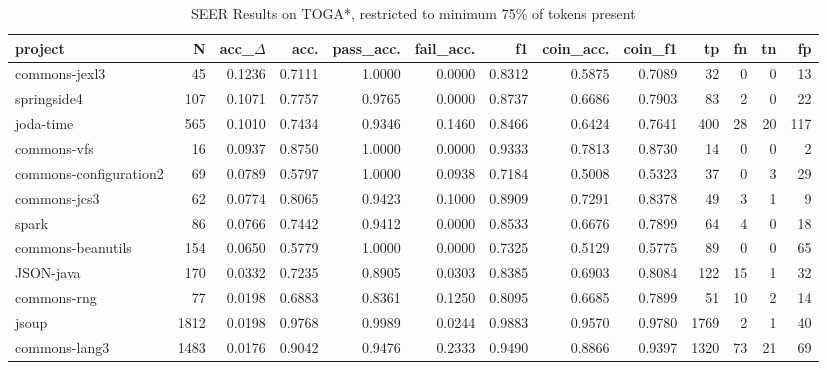 \begin{table*}
\centering
\caption{SEER Results on TOGA*, restricted to minimum 75\% of tokens present}
\label{tab:toga_results_25}
\begin{tabular}{lrrrrrrrrrrrr}
\toprule
                project &     N &  acc\_$\Delta$ &    acc. &  pass\_acc. &  fail\_acc. &      f1 &  coin\_acc. &  coin\_f1 &    tp &   fn &  tn &   fp \\
\midrule
          commons-jexl3 &    45 &      0.1236 &  0.7111 &     1.0000 &     0.0000 &  0.8312 &     0.5875 &   0.7089 &    32 &    0 &   0 &   13 \\
            springside4 &   107 &      0.1071 &  0.7757 &     0.9765 &     0.0000 &  0.8737 &     0.6686 &   0.7903 &    83 &    2 &   0 &   22 \\
              joda-time &   565 &      0.1010 &  0.7434 &     0.9346 &     0.1460 &  0.8466 &     0.6424 &   0.7641 &   400 &   28 &  20 &  117 \\
            commons-vfs &    16 &      0.0937 &  0.8750 &     1.0000 &     0.0000 &  0.9333 &     0.7813 &   0.8730 &    14 &    0 &   0 &    2 \\
 commons-configuration2 &    69 &      0.0789 &  0.5797 &     1.0000 &     0.0938 &  0.7184 &     0.5008 &   0.5323 &    37 &    0 &   3 &   29 \\
           commons-jcs3 &    62 &      0.0774 &  0.8065 &     0.9423 &     0.1000 &  0.8909 &     0.7291 &   0.8378 &    49 &    3 &   1 &    9 \\
                  spark &    86 &      0.0766 &  0.7442 &     0.9412 &     0.0000 &  0.8533 &     0.6676 &   0.7899 &    64 &    4 &   0 &   18 \\
      commons-beanutils &   154 &      0.0650 &  0.5779 &     1.0000 &     0.0000 &  0.7325 &     0.5129 &   0.5775 &    89 &    0 &   0 &   65 \\
              JSON-java &   170 &      0.0332 &  0.7235 &     0.8905 &     0.0303 &  0.8385 &     0.6903 &   0.8084 &   122 &   15 &   1 &   32 \\
            commons-rng &    77 &      0.0198 &  0.6883 &     0.8361 &     0.1250 &  0.8095 &     0.6685 &   0.7899 &    51 &   10 &   2 &   14 \\
                  jsoup &  1812 &      0.0198 &  0.9768 &     0.9989 &     0.0244 &  0.9883 &     0.9570 &   0.9780 &  1769 &    2 &   1 &   40 \\
          commons-lang3 &  1483 &      0.0176 &  0.9042 &     0.9476 &     0.2333 &  0.9490 &     0.8866 &   0.9397 &  1320 &   73 &  21 &   69 \\

\end{tabular}
\end{table*}
